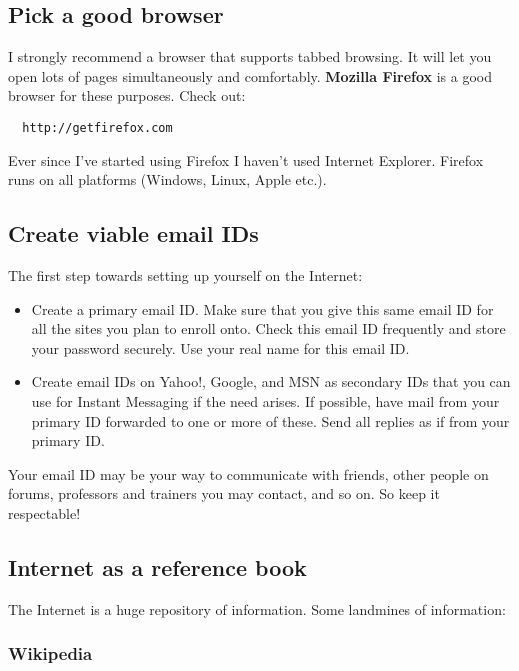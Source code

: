 \documentclass[a4paper]{amsart}
\begin{document}
\subsection{Pick a good browser}

I strongly recommend a browser that supports tabbed browsing. 
It will let you open lots of pages simultaneously and comfortably.
{\bf Mozilla Firefox} is a good browser for these purposes. Check out:

\begin{verbatim}
  http://getfirefox.com
\end{verbatim}

Ever since I've started using Firefox I haven't used Internet Explorer. Firefox runs on all platforms (Windows, Linux, Apple etc.).

\subsection{Create viable email IDs}

The first step towards setting up yourself on the Internet:

\begin{itemize}

\item Create a primary email ID. Make sure that you give this same email ID for all the sites you plan to enroll onto. Check this
  email ID frequently and store your password securely. Use your real name for this email ID.

\item Create email IDs on Yahoo!, Google, and MSN as secondary IDs that you can use for Instant Messaging if the need arises. If possible,
  have mail from your primary ID forwarded to one or more of these. Send all replies as if from your primary ID.

\end{itemize}

Your email ID may be your way to communicate with friends, other people on forums, professors and trainers you may contact, and so on.
So keep it respectable!

\subsection{Internet as a reference book}

The Internet is a huge repository of information. Some landmines of information:

\subsubsection{Wikipedia}
\end{document}
